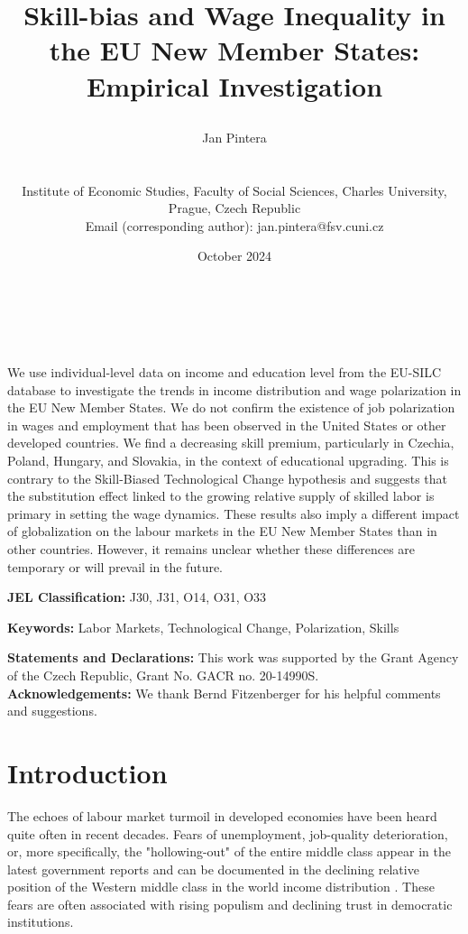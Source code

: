 \documentclass[11pt]{article}
\title{\begin{LARGE}Skill-bias and Wage Inequality in the EU New Member States: Empirical Investigation\end{LARGE}}
\author{    
    \begin{large}Jan Pintera\end{large} \\\vspace{5mm} \begin{small} Institute of Economic Studies, Faculty of Social Sciences, Charles University,\\ Prague, Czech Republic\\
    Email (corresponding author): jan.pintera@fsv.cuni.cz \end{small}
}
\date{October 2024}
\makeatletter
\renewcommand{\maketitle}{\bgroup\setlength{\parindent}{0pt}
\begin{flushright}
  \textbf{\@title}\\
  \vspace{5mm}
  \@author\\
  \vspace{5mm}
  \@date
\end{flushright}\egroup
}
\renewenvironment{abstract}
 {\small
  \begin{flushleft}
  \bfseries \abstractname\vspace{-.5em}\vspace{0pt}
  \end{flushleft}
  \list{}{%
    \setlength{\leftmargin}{0mm}%
    \setlength{\rightmargin}{\leftmargin}%
  }%
  \item\relax}
 {\endlist}
\def \jel {	J30, J31, O14, O31, O33}
\def \Keywords {Labor Markets, Technological Change, Polarization, Skills}
\makeatother
\begin{document}
\maketitle

\thispagestyle{empty}
\begin{abstract}
We use individual-level data on income and education level from the EU-SILC database to investigate the trends in income distribution and wage polarization in the EU New Member States. We do not confirm the existence of job polarization in wages and employment that has been observed in the United States or other developed countries. We find a decreasing skill premium, particularly in Czechia, Poland, Hungary, and Slovakia, in the context of educational upgrading. This is contrary to the Skill-Biased Technological Change hypothesis and suggests that the substitution effect linked to the growing relative supply of skilled labor is primary in setting the wage dynamics. These results also imply a different impact of globalization on the labour markets in the EU New Member States than in other countries. However, it remains unclear whether these differences are temporary or will prevail in the future.
\bigskip

\textbf{JEL Classification:} \jel

\textbf{Keywords:}  \Keywords

\bigskip
\textbf{Statements and Declarations:}
This work was supported by the Grant Agency of the Czech Republic, Grant No. GACR no. 20-14990S.
\\

\textbf{Acknowledgements:}
We thank Bernd Fitzenberger for his helpful comments and suggestions.

\end{abstract}
\clearpage
\setcounter{page}{1}



\section{Introduction}
The echoes of labour market turmoil in developed economies have been heard quite often in recent decades. Fears of unemployment, job-quality deterioration, or, more specifically, the "hollowing-out" of the entire middle class appear in the latest government reports \citetext{e.g., \citealt{rodrik2020economic}} and can be documented in the declining relative position of the Western middle class in the world income distribution \citep{milanovic2020elephant}. These fears are often associated with rising populism and declining trust in democratic institutions.
\end{document}
